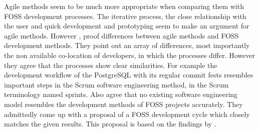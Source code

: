 Agile methods seem to be much more appropriate when comparing them with
\ac{FOSS} development processes. The iterative process, the close relationship
with the user and quick development and prototyping seem to make an argument
for agile methods. However \textcite{Koch2004}, \textcite{Warsta2003} proof
differences between agile methods and \ac{FOSS} development methods. They point
out an array of differences, most importantly the non available co-location of
developers, in which the processes differ. However they agree that the
processes show clear similarities. For example the development workflow of the
PostgreSQL with its regular commit fests resembles important steps in the Scrum
software engineering method, in the Scrum terminology named sprints. Also
\textcite{Roets2007} agree that no existing software engineering model
resembles the development methods of \ac{FOSS} projects accurately. They
admittedly come up with a proposal of a \ac{FOSS} development cycle which
closely matches the given results. This proposal is based on the findings by
\textcite{Jorgensen2001}.


